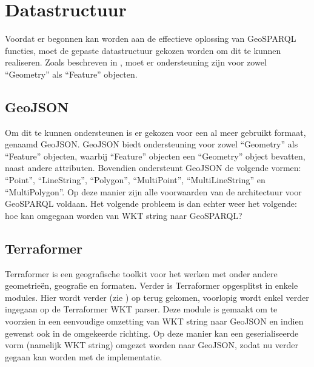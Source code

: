 \section{Datastructuur}
\label{sec:datastructuur}
Voordat er begonnen kan worden aan de effectieve oplossing van GeoSPARQL functies, moet de gepaste datastructuur gekozen worden om dit te kunnen realiseren. Zoals beschreven in , moet er ondersteuning zijn voor zowel ``Geometry'' als ``Feature'' objecten. 

\subsection{GeoJSON}
Om dit te kunnen ondersteunen is er gekozen voor een al meer gebruikt formaat, genaamd GeoJSON. GeoJSON biedt ondersteuning voor zowel ``Geometry'' als ``Feature'' objecten, waarbij ``Feature'' objecten een ``Geometry'' object bevatten, naast andere attributen. Bovendien ondersteunt GeoJSON de volgende vormen: ``Point'', ``LineString'', ``Polygon'', ``MultiPoint'', ``MultiLineString'' en ``MultiPolygon''. Op deze manier zijn alle voorwaarden van de architectuur voor GeoSPARQL voldaan. Het volgende probleem is dan echter weer het volgende: hoe kan omgegaan worden van WKT string naar GeoSPARQL?

\subsection{Terraformer}
Terraformer is een geografische toolkit voor het werken met onder andere geometrieën, geografie en formaten. Verder is Terraformer opgesplitst in enkele modules. Hier wordt verder (zie ) op terug gekomen, voorlopig wordt enkel verder ingegaan op de Terraformer WKT parser. Deze module is gemaakt om te voorzien in een eenvoudige omzetting van WKT string naar GeoJSON en indien gewenst ook in de omgekeerde richting. Op deze manier kan een geserialiseerde vorm (namelijk WKT string) omgezet worden naar GeoJSON, zodat nu verder gegaan kan worden met de implementatie. 



